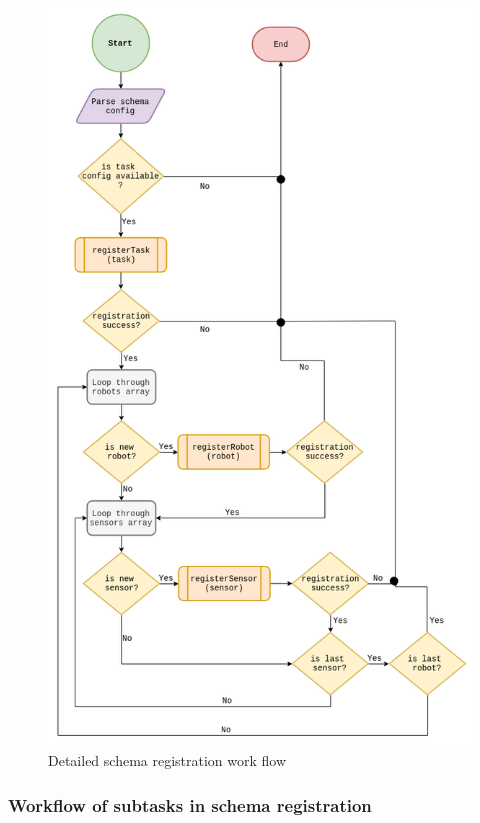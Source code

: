 	\begin{figure}[!htbp] 
		\begin{center}
			\includegraphics[scale=0.5]{./images/png/implementation/schema_registration}	
			\caption{Detailed schema registration work flow}	
			\label{fig:schema_registration}	
		\end{center}
	\end{figure}

	\subsubsection{Workflow of subtasks in schema registration}
	
